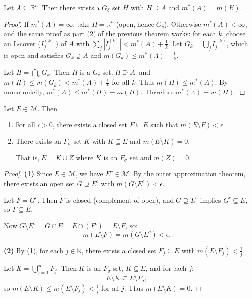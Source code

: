 \documentclass[11pt]{report}
\begin{document}
\begin{propbox}
Let $A \subseteq \mathbb{R}^n$. Then there exists a $G_\delta$ set $H$ with $H \supseteq A$ and $m^*(A) = m(H)$.
\end{propbox}

\begin{proof}
If $m^*(A) = \infty$, take $H = \mathbb{R}^n$ (open, hence $G_\delta$). Otherwise $m^*(A) < \infty$, and the same proof as part (2) of the previous theorem works: for each $k$, choose an L-cover $\{I_j^{(k)}\}$ of $A$ with $\sum_j |I_j^{(k)}| < m^*(A) + \frac{1}{k}$. Let $G_k = \bigcup_j I_j^{(k)}$, which is open and satisfies $G_k \supseteq A$ and $m(G_k) \leq m^*(A) + \frac{1}{k}$.

Let $H = \bigcap_k G_k$. Then $H$ is a $G_\delta$ set, $H \supseteq A$, and $m(H) \leq m(G_k) < m^*(A) + \frac{1}{k}$ for all $k$. Thus $m(H) \leq m^*(A)$. By monotonicity, $m^*(A) \leq m^*(H) = m(H)$. Therefore $m^*(A) = m(H)$.
\end{proof}

\begin{thmbox}
Let $E \in \mathcal{M}$. Then:
\begin{enumerate}
    \item For all $\epsilon > 0$, there exists a closed set $F \subseteq E$ such that $m(E \setminus F) < \epsilon$.
    \item There exists an $F_\sigma$ set $K$ with $K \subseteq E$ and $m(E \setminus K) = 0$.
    
    That is, $E = K \cup Z$ where $K$ is an $F_\sigma$ set and $m(Z) = 0$.
\end{enumerate}
\end{thmbox}

\begin{proof}
\textbf{(1)} Since $E \in \mathcal{M}$, we have $E^c \in \mathcal{M}$. By the outer approximation theorem, there exists an open set $G \supseteq E^c$ with $m(G \setminus E^c) < \epsilon$.

Let $F = G^c$. Then $F$ is closed (complement of open), and $G \supseteq E^c$ implies $G^c \subseteq E$, so $F \subseteq E$.

Now $G \setminus E^c = G \cap E = E \cap (F^c) = E \setminus F$, so:
\[
m(E \setminus F) = m(G \setminus E^c) < \epsilon.
\]

\textbf{(2)} By (1), for each $j \in \mathbb{N}$, there exists a closed set $F_j \subseteq E$ with $m(E \setminus F_j) < \frac{1}{j}$.

Let $K = \bigcup_{j=1}^{\infty} F_j$. Then $K$ is an $F_\sigma$ set, $K \subseteq E$, and for each $j$:
\[
E \setminus K \subseteq E \setminus F_j,
\]
so $m(E \setminus K) \leq m(E \setminus F_j) < \frac{1}{j}$ for all $j$. Thus $m(E \setminus K) = 0$.
\end{proof}
\end{document}
